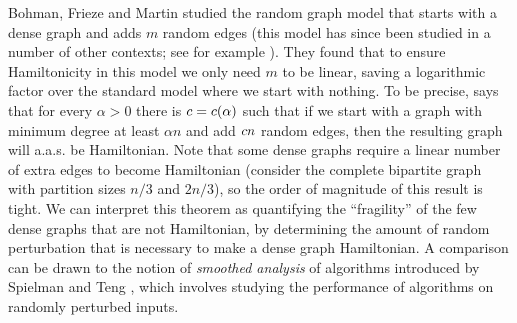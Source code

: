 \documentclass[11pt,english]{article}
\theoremstyle{plain}
\theoremstyle{definition}
\theoremstyle{definition}
\theoremstyle{plain}
\theoremstyle{plain}
\theoremstyle{plain}
\theoremstyle{plain}
\theoremstyle{remark}
\theoremstyle{remark}
\let\originalleft\left
\let\originalright\right
\renewcommand{\left}{\mathopen{}\mathclose\bgroup\originalleft}
\renewcommand{\right}{\aftergroup\egroup\originalright}
\begin{document}
Bohman, Frieze and Martin \cite{BFM03} studied the random graph model that
starts with a dense graph and adds $m$ random edges (this model has
since been studied in a number of other contexts; see for example
\cite{BHM04,KST06}). They found that to ensure Hamiltonicity in this
model we only need $m$ to be linear, saving a logarithmic factor
over the standard model where we start with nothing. To be precise,
\cite[Theorem~1]{BFM03} says that for every $\alpha>0$ there is
$\cdi=\cdi\left(\alpha\right)$ such that if we start with a graph with
minimum degree at least $\alpha n$ and add $c n$
random edges, then the resulting graph will a.a.s.{} be Hamiltonian.
Note that some dense graphs require a linear number of extra edges
to become Hamiltonian (consider the complete bipartite graph with
partition sizes $n/3$ and $2n/3$), so the order of magnitude of this result is tight. 
We can interpret this theorem as quantifying the ``fragility''
of the few dense graphs that are not Hamiltonian, by determining the
amount of random perturbation that is necessary to make a dense graph
Hamiltonian. A comparison can be drawn to the notion of \emph{smoothed
analysis} of algorithms introduced by Spielman and Teng \cite{ST04}, which involves
studying the performance of algorithms on randomly perturbed inputs.
\end{document}
